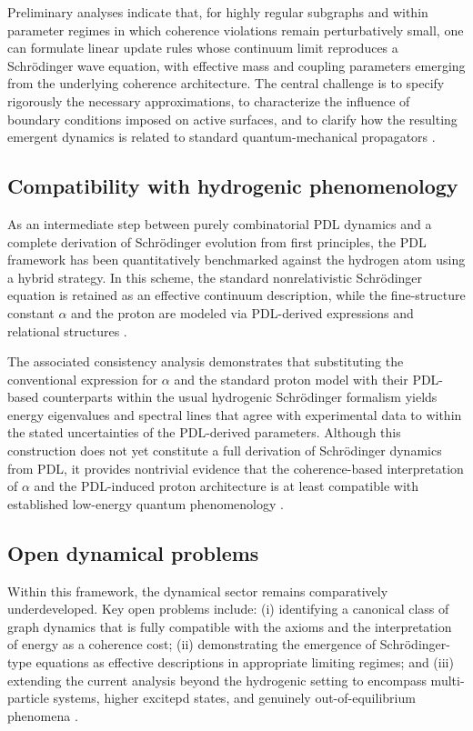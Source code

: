 \documentclass[11pt,a4paper]{article}
\begin{document}
Preliminary analyses indicate that, for highly regular subgraphs and within parameter regimes in which coherence violations remain perturbatively small, one can formulate linear update rules whose continuum limit reproduces a Schr\"odinger wave equation, with effective mass and coupling parameters emerging from the underlying coherence architecture. The central challenge is to specify rigorously the necessary approximations, to characterize the influence of boundary conditions imposed on active surfaces, and to clarify how the resulting emergent dynamics is related to standard quantum-mechanical propagators \citep{Coherence_Leakage_18_2026,PDL_position}.

\subsection{Compatibility with hydrogenic phenomenology}
\label{subsec:hydrogen_compatibility}

As an intermediate step between purely combinatorial PDL dynamics and a complete derivation of Schrödinger evolution from first principles, the PDL framework has been quantitatively benchmarked against the hydrogen atom using a hybrid strategy. In this scheme, the standard nonrelativistic Schrödinger equation is retained as an effective continuum description, while the fine-structure constant \(\alpha\) and the proton are modeled via PDL-derived expressions and relational structures \citep{Schrodinger_Sketch_v2_2026}.

The associated consistency analysis demonstrates that substituting the conventional expression for \(\alpha\) and the standard proton model with their PDL-based counterparts within the usual hydrogenic Schrödinger formalism yields energy eigenvalues and spectral lines that agree with experimental data to within the stated uncertainties of the PDL-derived parameters. Although this construction does not yet constitute a full derivation of Schrödinger dynamics from PDL, it provides nontrivial evidence that the coherence-based interpretation of \(\alpha\) and the PDL-induced proton architecture is at least compatible with established low-energy quantum phenomenology \citep{Schrodinger_Sketch_v2_2026,PDL_position}.

\subsection{Open dynamical problems}
\label{subsec:dynamical_open}

Within this framework, the dynamical sector remains comparatively underdeveloped. Key open problems include: (i) identifying a canonical class of graph dynamics that is fully compatible with the axioms and the interpretation of energy as a coherence cost; (ii) demonstrating the emergence of Schrödinger-type equations as effective descriptions in appropriate limiting regimes; and (iii) extending the current analysis beyond the hydrogenic setting to encompass multi-particle systems, higher excitepd states, and genuinely out-of-equilibrium phenomena
\citep{Coherence_Leakage_18_2026,PDL_position}.
\end{document}

